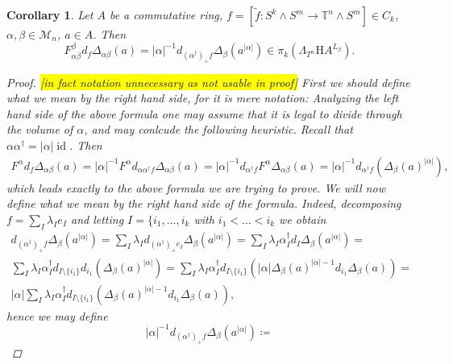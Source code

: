\documentclass[10pt, a4paper, UKenglish]{article}
\numberwithin{equation}{section}
\newcommand{\cM}{\mathcal{M}}
\newcommand{\sT}{\mathbb{T}}		%
\newcommand{\defas}{\coloneqq}  %
\newcommand{\abs}[1]{\left\vert#1\right\vert}	%
\newcommand{\id}{\operatorname{id}}
\newcommand{\comm}[1]{\colorbox{yellow}{#1}}
\renewcommand{\H}{\mathrm{H}}
\theoremstyle{plain}
\newtheorem{cor}[equation]{Corollary}
\theoremstyle{definition}
\renewcommand{\to}{\longrightarrow}
\begin{document}
\begin{cor}\label{cor_fdw_relation_arbitrary_dimensions}
Let $A$ be a commutative ring, $f = [\tilde{f}: S^k \wedge S^m \to \sT^n \wedge S^m] \in C_k$, $\alpha,\beta \in \cM_n$, $a \in A$. Then
\begin{equation*}
  F_{\alpha\beta}^\beta d_f \Delta_{\alpha\beta} (a) =%
  \abs{\alpha}^{-1}d_{(\alpha^\dagger)_+ f} \Delta_{\beta}(a^{\abs{\alpha}})%
  \in \pi_k (\Lambda_{T^n} \H A ^{L_\beta}).%
\end{equation*}
\begin{proof}
\comm{[in fact notation unnecessary as not usable in proof]} First we should define what we mean by the right hand side, for it is mere notation: Analyzing the left hand side of the above formula one may assume that it is legal to divide through the volume of $\alpha$, and may conlcude the following heuristic. Recall that $\alpha \alpha^\dagger = \abs{\alpha} \id$. Then
\begin{gather*}
  F^\alpha d_f \Delta_{\alpha\beta} (a) = %
    \abs{\alpha}^{-1} F^\alpha d_{\alpha \alpha^\dagger f}%
      \Delta_{\alpha\beta} (a) = %
    \abs{\alpha}^{-1} d_{\alpha^\dagger f} F^\alpha
      \Delta_{\alpha\beta} (a) = %
    \abs{\alpha}^{-1} d_{\alpha^\dagger f}
      ( \Delta_{\beta} (a)^{\abs{\alpha}} ),%
\end{gather*}
which leads exactly to the above formula we are trying to prove. We will now define what we mean by the right hand side of the formula. Indeed, decomposing $f = \sum_I \lambda_I e_I$ and letting $I = \{i_1, \ldots , i_k$ with $i_1 < \ldots < i_k$ we obtain
\begin{gather*}
  d_{(\alpha^\dagger)_+ f} \Delta_{\beta}(a^{\abs{\alpha}}) = %
  \sum_I \lambda_I d_{(\alpha^\dagger)_+ e_I} \Delta_{\beta}
    (a^{\abs{\alpha}}) = %
  \sum_I \lambda_I \alpha^\dagger_I d_I \Delta_{\beta}(a^{\abs{\alpha}}) = \\%
  \sum_I \lambda_I \alpha^\dagger_I d_{I \setminus \{i_1\}} d_{i_1}
    (\Delta_{\beta}(a)^{\abs{\alpha}}) = %
  \sum_I \lambda_I \alpha^\dagger_I d_{I \setminus \{i_1\}} (
    \abs{\alpha} \Delta_{\beta}(a)^{\abs{\alpha}-1} d_{i_1} \Delta_{\beta}(a) ) = \\%
  \abs{\alpha} \sum_I \lambda_I \alpha^\dagger_I d_{I \setminus \{i_1\}}
    (\Delta_{\beta}(a)^{\abs{\alpha}-1} d_{i_1} \Delta_{\beta}(a)),%
\end{gather*}
hence we may define
\begin{equation*}
	\abs{\alpha}^{-1} d_{(\alpha^\dagger)_+ f} \Delta_{\beta}(a^{\abs{\alpha}}) \defas %

\end{equation*}
\end{proof}
\end{cor}
\end{document}
